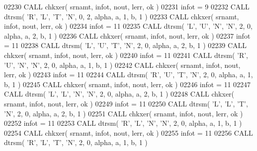 \begin{DoxyCode}
02230       \textcolor{keyword}{CALL }chkxer( srnamt, infot, nout, lerr, ok )
02231       infot = 9
02232       \textcolor{keyword}{CALL }dtrsm( \textcolor{stringliteral}{'R'}, \textcolor{stringliteral}{'L'}, \textcolor{stringliteral}{'T'}, \textcolor{stringliteral}{'N'}, 0, 2, alpha, a, 1, b, 1 )
02233       \textcolor{keyword}{CALL }chkxer( srnamt, infot, nout, lerr, ok )
02234       infot = 11
02235       \textcolor{keyword}{CALL }dtrsm( \textcolor{stringliteral}{'L'}, \textcolor{stringliteral}{'U'}, \textcolor{stringliteral}{'N'}, \textcolor{stringliteral}{'N'}, 2, 0, alpha, a, 2, b, 1 )
02236       \textcolor{keyword}{CALL }chkxer( srnamt, infot, nout, lerr, ok )
02237       infot = 11
02238       \textcolor{keyword}{CALL }dtrsm( \textcolor{stringliteral}{'L'}, \textcolor{stringliteral}{'U'}, \textcolor{stringliteral}{'T'}, \textcolor{stringliteral}{'N'}, 2, 0, alpha, a, 2, b, 1 )
02239       \textcolor{keyword}{CALL }chkxer( srnamt, infot, nout, lerr, ok )
02240       infot = 11
02241       \textcolor{keyword}{CALL }dtrsm( \textcolor{stringliteral}{'R'}, \textcolor{stringliteral}{'U'}, \textcolor{stringliteral}{'N'}, \textcolor{stringliteral}{'N'}, 2, 0, alpha, a, 1, b, 1 )
02242       \textcolor{keyword}{CALL }chkxer( srnamt, infot, nout, lerr, ok )
02243       infot = 11
02244       \textcolor{keyword}{CALL }dtrsm( \textcolor{stringliteral}{'R'}, \textcolor{stringliteral}{'U'}, \textcolor{stringliteral}{'T'}, \textcolor{stringliteral}{'N'}, 2, 0, alpha, a, 1, b, 1 )
02245       \textcolor{keyword}{CALL }chkxer( srnamt, infot, nout, lerr, ok )
02246       infot = 11
02247       \textcolor{keyword}{CALL }dtrsm( \textcolor{stringliteral}{'L'}, \textcolor{stringliteral}{'L'}, \textcolor{stringliteral}{'N'}, \textcolor{stringliteral}{'N'}, 2, 0, alpha, a, 2, b, 1 )
02248       \textcolor{keyword}{CALL }chkxer( srnamt, infot, nout, lerr, ok )
02249       infot = 11
02250       \textcolor{keyword}{CALL }dtrsm( \textcolor{stringliteral}{'L'}, \textcolor{stringliteral}{'L'}, \textcolor{stringliteral}{'T'}, \textcolor{stringliteral}{'N'}, 2, 0, alpha, a, 2, b, 1 )
02251       \textcolor{keyword}{CALL }chkxer( srnamt, infot, nout, lerr, ok )
02252       infot = 11
02253       \textcolor{keyword}{CALL }dtrsm( \textcolor{stringliteral}{'R'}, \textcolor{stringliteral}{'L'}, \textcolor{stringliteral}{'N'}, \textcolor{stringliteral}{'N'}, 2, 0, alpha, a, 1, b, 1 )
02254       \textcolor{keyword}{CALL }chkxer( srnamt, infot, nout, lerr, ok )
02255       infot = 11
02256       \textcolor{keyword}{CALL }dtrsm( \textcolor{stringliteral}{'R'}, \textcolor{stringliteral}{'L'}, \textcolor{stringliteral}{'T'}, \textcolor{stringliteral}{'N'}, 2, 0, alpha, a, 1, b, 1 )

\end{DoxyCode}
